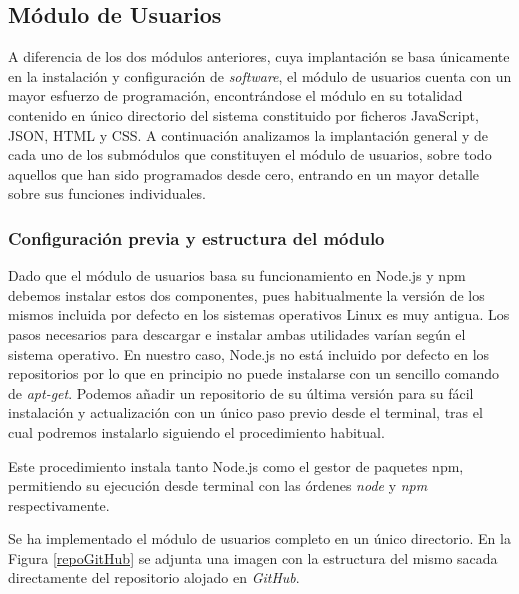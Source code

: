 \subsection{Módulo de Usuarios}
A diferencia de los dos módulos anteriores, cuya implantación se basa únicamente en la instalación y configuración de \emph{software}, el módulo de usuarios cuenta con un mayor esfuerzo de programación, encontrándose el módulo en su totalidad contenido en único directorio del sistema constituido por ficheros JavaScript, JSON, HTML y CSS. A continuación analizamos la implantación general y de cada uno de los submódulos que constituyen el módulo de usuarios, sobre todo aquellos que han sido programados desde cero, entrando en un mayor detalle sobre sus funciones individuales.

\subsubsection{Configuración previa y estructura del módulo} \label{userModuleConfig}
Dado que el módulo de usuarios basa su funcionamiento en Node.js y npm debemos instalar estos dos componentes, pues habitualmente la versión de los mismos incluida por defecto en los sistemas operativos Linux es muy antigua. Los pasos necesarios para descargar e instalar ambas utilidades varían según el sistema operativo. En nuestro caso, Node.js no está incluido por defecto en los repositorios por lo que en principio no puede instalarse con un sencillo comando de \emph{apt-get}. Podemos añadir un repositorio de su última versión para su fácil instalación y actualización con un único paso previo desde el terminal, tras el cual podremos instalarlo siguiendo el procedimiento habitual.


Este procedimiento instala tanto Node.js como el gestor de paquetes npm, permitiendo su ejecución desde terminal con las órdenes \emph{node} y \emph{npm} respectivamente.

Se ha implementado el módulo de usuarios completo en un único directorio. En la Figura \ref{repoGitHub} se adjunta una imagen con la estructura del mismo sacada directamente del repositorio alojado en \emph{GitHub}.

